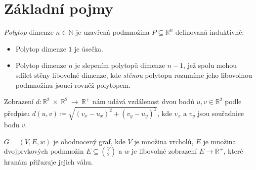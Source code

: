 \section{Základní pojmy}
\label{sec:zakladni-pojmy}

\begin{definition}[Polytop]
    \emph{Polytop} dimenze $n \in \mathbb{N}$ je uzavřená podmnožina $P \subseteq \mathbb{R}^{n}$ definovaná induktivně:
    \begin{itemize}
        \item Polytop dimenze $1$ je úsečka.
        \item Polytop dimenze $n$ je slepením polytopů dimenze $n-1$, jež spolu mohou
            sdílet stěny libovolné dimenze, kde \emph{stěnou} polytopu rozumíme jeho
            libovolnou podmnožinu jsoucí rovněž polytopem. \autocite{adamklepacDefinicePolytopu2024}
    \end{itemize}
    
\end{definition}

\begin{definition}[Vzdálenost]
    \label{definice:vzdalenost}
    Zobrazení $d: \mathbb{R}^2~\times~\mathbb{R}^2~\rightarrow~\mathbb{R}^+$ nám udává vzdálenost dvou bodů $u, v \in \mathbb{R}^2$ podle předpisu $d(u, v) \coloneqq \sqrt{(v_x-u_x)^2+(v_y-u_y)^2}$, kde $v_x$ a $v_y$ jsou souřadnice bodu $v$. 
\end{definition}

\begin{definition}
    \label{definice:ohodnoceny_graf}
    $G = (V, E, w)$ je ohodnocený graf, kde $V$ je množina vrcholů, $E$ je množina dvojprvkových podmnožin $E \subseteq \binom{V}{2}$ a $w$ je libovolné zobrazení $E \rightarrow \mathds{R}^+$, které hranám přiřazuje jejich váhu.
\end{definition}

